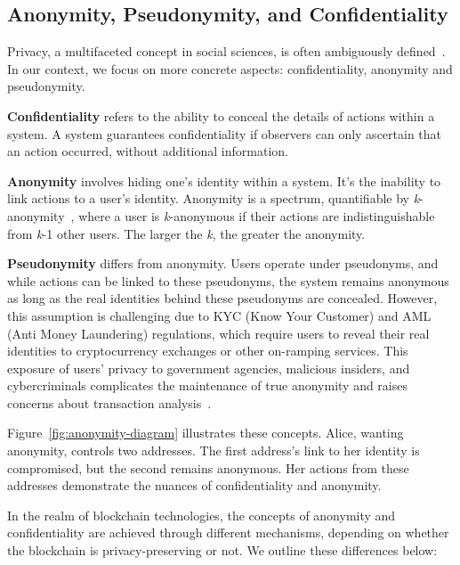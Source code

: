 \documentclass[pdftex,twocolumn,epjc3]{svjour3}
\begin{document}
\subsection{Anonymity, Pseudonymity, and Confidentiality}\label{sec:pseudo-anon}

\begin{sloppypar}
Privacy, a multifaceted concept in social sciences, is often ambiguously defined~\cite{smithInformationPrivacyResearch2011}. In our context, we focus on more concrete aspects: confidentiality, anonymity and pseudonymity.
\end{sloppypar}

\textbf{Confidentiality} refers to the ability to conceal the details of actions within a system. A system guarantees confidentiality if observers can only ascertain that an action occurred, without additional information.

\textbf{Anonymity} involves hiding one's identity within a system. It's the inability to link actions to a user's identity. Anonymity is a spectrum, quantifiable by \textit{k}-anonymity~\cite{sweeneyKanonymityModelProtecting2002}, where a user is \textit{k}-anonymous if their actions are indistinguishable from \textit{k}-1 other users. The larger the \textit{k}, the greater the anonymity.

\begin{sloppypar}
\textbf{Pseudonymity} differs from anonymity. Users operate under pseudonyms, and while actions can be linked to these pseudonyms, the system remains anonymous as long as the real identities behind these pseudonyms are concealed. However, this assumption is challenging due to KYC (Know Your Customer) and AML (Anti Money Laundering) regulations, which require users to reveal their real identities to cryptocurrency exchanges or other on-ramping services. This exposure of users' privacy to government agencies, malicious insiders, and cybercriminals complicates the maintenance of true anonymity and raises concerns about transaction analysis~\cite{androulakiEvaluatingUserPrivacy2013, oberStructureAnonymityBitcoin2013}.

Figure~\ref{fig:anonymity-diagram} illustrates these concepts. Alice, wanting anonymity, controls two addresses. The first address's link to her identity is compromised, but the second remains anonymous. Her actions from these addresses demonstrate the nuances of confidentiality and anonymity.
\end{sloppypar}

In the realm of blockchain technologies, the concepts of anonymity and confidentiality are achieved through different mechanisms, depending on whether the blockchain is privacy-preserving or not. We outline these differences below:
\end{document}
